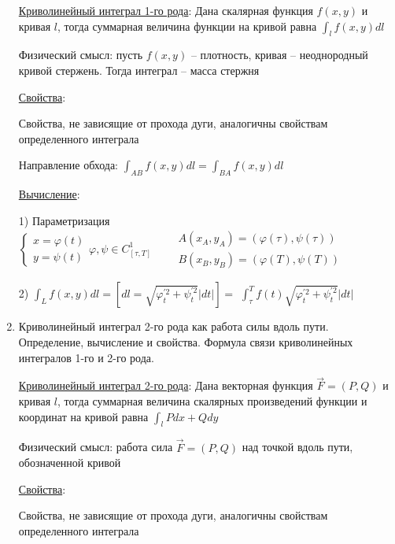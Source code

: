 \documentclass[12pt]{article}
\begin{document}
\begin{enumerate}
        \hyperlink{curvilinearintegraloffirstkind}{Криволинейный интеграл 1-го рода}: Дана скалярная функция $f(x, y)$ и кривая $l$, тогда суммарная величина функции на кривой равна $\int_l f(x, y) dl$

        Физический смысл: пусть $f(x, y)$ -- плотность, кривая -- неоднородный кривой стержень. Тогда интеграл -- масса стержня

        \hyperlink{curvilinearintegraloffirstkindproperties}{Свойства}:

        Свойства, не зависящие от прохода дуги, аналогичны свойствам определенного интеграла

        Направление обхода: $\int_{AB} f(x, y)dl = \int_{BA} f(x, y)dl$

        \hyperlink{curvilinearintegraloffirstkindcalculation}{Вычисление}:

        1) Параметризация $\begin{cases}
            x = \varphi(t) \\
            y = \psi(t)
        \end{cases} \varphi, \psi \in C^1_{[\tau, T]} \quad\quad \begin{matrix}
            A(x_A, y_A) = (\varphi(\tau), \psi(\tau)) \\
            B(x_B, y_B) = (\varphi(T), \psi(T))
        \end{matrix}$

        2) $\int_{L} f(x, y) dl = \left[dl = \sqrt{\varphi_t^{\prime 2} + \psi_t^{\prime 2}}|dt|\right] = $
        $\int_\tau^T f(t) \sqrt{\varphi_t^{\prime 2} + \psi_t^{\prime 2}}|dt|$

        \item Криволинейный интеграл 2-го рода как работа силы вдоль пути. Определение, вычисление и свойства. Формула связи криволинейных интегралов 1-го и 2-го рода.

        \hyperlink{curvilinearintegralofsecondkind}{Криволинейный интеграл 2-го рода}:
        Дана векторная функция $\overrightarrow{F} = (P, Q)$ и кривая $l$, тогда суммарная величина скалярных произведений функции и координат на кривой равна $\int_{l} Pdx + Qdy$

        Физический смысл: работа сила $\overrightarrow{F} = (P, Q)$ над точкой вдоль пути, обозначенной кривой

        \hyperlink{curvilinearintegraloffirstkindproperties}{Свойства}:

        Свойства, не зависящие от прохода дуги, аналогичны свойствам определенного интеграла


\end{enumerate}
\end{document}
